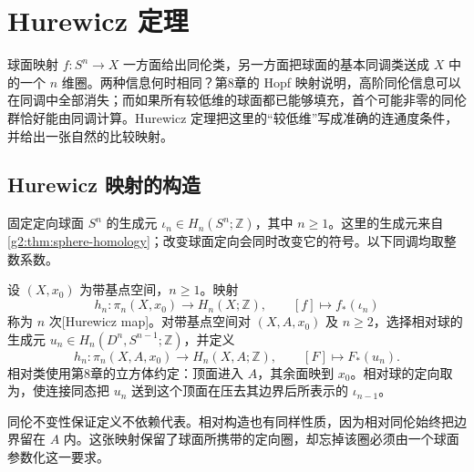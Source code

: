 
% 
% 

\section{Hurewicz 定理}
\label{g2:sec:0902}

球面映射 \(f:S^n\to X\) 一方面给出同伦类，另一方面把球面的基本同调类送成 \(X\) 中的一个 \(n\) 维圈。两种信息何时相同？第8章的 Hopf 映射说明，高阶同伦信息可以在同调中全部消失；而如果所有较低维的球面都已能够填充，首个可能非零的同伦群恰好能由同调计算。Hurewicz 定理把这里的“较低维”写成准确的连通度条件，并给出一张自然的比较映射。

\subsection{Hurewicz 映射的构造}
\label{g2:subsec:0902:01}

固定定向球面 \(S^n\) 的生成元 \(\iota_n\in H_n(S^n;\mathbb Z)\)，其中 \(n\ge1\)。这里的生成元来自\cref{g2:thm:sphere-homology}；改变球面定向会同时改变它的符号。以下同调均取整数系数。

\begin{definition}[Hurewicz 映射]\label{g2:def:hurewicz-map}
	设 \((X,x_0)\) 为带基点空间，\(n\ge1\)。映射
	\[
		h_n:\pi_n(X,x_0)\longrightarrow H_n(X;\mathbb Z),\qquad [f]\longmapsto f_*(\iota_n)
	\]
	称为 \(n\) 次[Hurewicz map]。对带基点空间对 \((X,A,x_0)\) 及 \(n\ge2\)，选择相对球的生成元 \(u_n\in H_n(D^n,S^{n-1};\mathbb Z)\)，并定义
	\[
		h_n:\pi_n(X,A,x_0)\longrightarrow H_n(X,A;\mathbb Z),\qquad [F]\longmapsto F_*(u_n).
	\]
	相对类使用第8章的立方体约定：顶面进入 \(A\)，其余面映到 \(x_0\)。相对球的定向取为，使连接同态把 \(u_n\) 送到这个顶面在压去其边界后所表示的 \(\iota_{n-1}\)。
\end{definition}

同伦不变性保证定义不依赖代表。相对构造也有同样性质，因为相对同伦始终把边界留在 \(A\) 内。这张映射保留了球面所携带的定向圈，却忘掉该圈必须由一个球面参数化这一要求。

